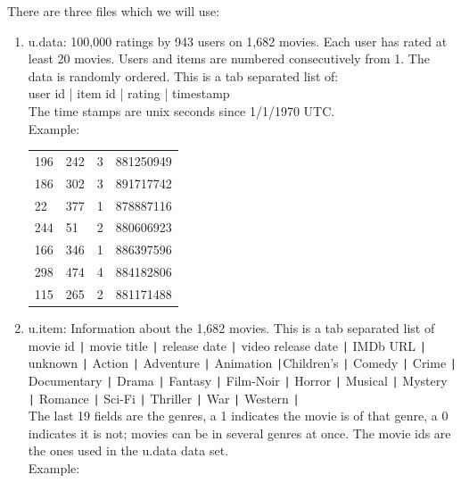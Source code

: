 \documentclass{article}
\begin{document}
There are three files which we will use:
\begin{enumerate}[1. ]

\item  u.data: 100,000 ratings by 943 users on 1,682 movies. Each  user has rated at least 20 movies. Users and items are numbered consecutively from 1. The data is randomly ordered. This is a tab separated list of:\\

user id | item id | rating | timestamp\\

The time stamps are unix seconds since 1/1/1970 UTC.\\

Example:\\

\begin{tabular}{l l l l}
196  &   242  &   3   &    881250949\\
186  &   302  &   3   &    891717742\\
22   &   377  &   1   &    878887116\\
244  &   51   &   2   &    880606923\\
166  &   346  &   1   &    886397596\\
298  &   474  &   4   &    884182806\\
115  &   265  &   2   &    881171488\\
\end{tabular}

\item  u.item: Information about the 1,682 movies. This is a tab separated list of\\

movie id \texttt{|} movie title \texttt{|} release date \texttt{|} video release date \texttt{|} IMDb URL \texttt{|} unknown \texttt{|} Action \texttt{|} Adventure \texttt{|} Animation \texttt{|}Children's \texttt{|} Comedy \texttt{|} Crime \texttt{|} Documentary \texttt{|} Drama \texttt{|} Fantasy \texttt{|} Film-Noir \texttt{|} Horror \texttt{|} Musical \texttt{|} Mystery \texttt{|} Romance \texttt{|} Sci-Fi \texttt{|} Thriller \texttt{|} War \texttt{|} Western \texttt{|}\\

The last 19 fields are the genres, a 1 indicates the movie is of that genre, a 0 indicates it is not; movies can be in several genres at once. The movie ids are the ones used in the u.data data set.\\

Example:\\


\end{enumerate}
\end{document}
